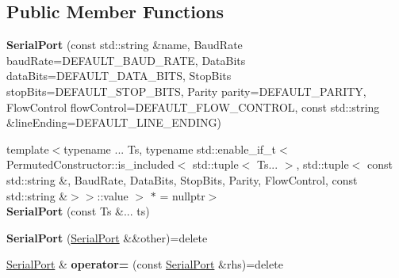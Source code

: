 \subsection*{Public Member Functions}
\begin{DoxyCompactItemize}
\item 
\mbox{\label{class_cpp_serial_port_1_1_serial_port_a42360a1556f13c1dd73f31d5e1210194}} 
{\bfseries Serial\+Port} (const std\+::string \&name, Baud\+Rate baud\+Rate=D\+E\+F\+A\+U\+L\+T\+\_\+\+B\+A\+U\+D\+\_\+\+R\+A\+TE, Data\+Bits data\+Bits=D\+E\+F\+A\+U\+L\+T\+\_\+\+D\+A\+T\+A\+\_\+\+B\+I\+TS, Stop\+Bits stop\+Bits=D\+E\+F\+A\+U\+L\+T\+\_\+\+S\+T\+O\+P\+\_\+\+B\+I\+TS, Parity parity=D\+E\+F\+A\+U\+L\+T\+\_\+\+P\+A\+R\+I\+TY, Flow\+Control flow\+Control=D\+E\+F\+A\+U\+L\+T\+\_\+\+F\+L\+O\+W\+\_\+\+C\+O\+N\+T\+R\+OL, const std\+::string \&line\+Ending=D\+E\+F\+A\+U\+L\+T\+\_\+\+L\+I\+N\+E\+\_\+\+E\+N\+D\+I\+NG)
\item 
\mbox{\label{class_cpp_serial_port_1_1_serial_port_af4d689fc5fe9bcab53d1d373cbaeabb1}} 
{\footnotesize template$<$typename ... Ts, typename std\+::enable\+\_\+if\+\_\+t$<$ Permuted\+Constructor\+::is\+\_\+included$<$ std\+::tuple$<$ Ts... $>$, std\+::tuple$<$ const std\+::string \&, Baud\+Rate, Data\+Bits, Stop\+Bits, Parity, Flow\+Control, const std\+::string \&$>$$>$\+::value $>$ $\ast$  = nullptr$>$ }\\{\bfseries Serial\+Port} (const Ts \&... ts)
\item 
\mbox{\label{class_cpp_serial_port_1_1_serial_port_af7a749032a61ed92de0654d076e7e46c}} 
{\bfseries Serial\+Port} (\mbox{\hyperlink{class_cpp_serial_port_1_1_serial_port}{Serial\+Port}} \&\&other)=delete
\item 
\mbox{\label{class_cpp_serial_port_1_1_serial_port_ad9f57729bd109a8630f495b6d63bc8a7}} 
\mbox{\hyperlink{class_cpp_serial_port_1_1_serial_port}{Serial\+Port}} \& {\bfseries operator=} (const \mbox{\hyperlink{class_cpp_serial_port_1_1_serial_port}{Serial\+Port}} \&rhs)=delete
\item 
\mbox{\label{class_cpp_serial_port_1_1_serial_port_a220dd4de1d53f2f5a11201f0220ec578}} 

\end{DoxyCompactItemize}
